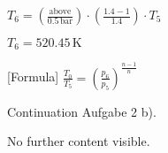 \( T_6 = \left( \frac{\text{above}}{0.5 \, \text{bar}} \right) \cdot \left( \frac{1.4 - 1}{1.4} \right) \cdot T_5 \)  

\( T_6 = 520.45 \, \text{K} \)  

[Formula] \( \frac{T_0}{T_5} = \left( \frac{p_6}{p_5} \right)^{\frac{n-1}{n}} \)

Continuation Aufgabe 2 b).  

No further content visible.